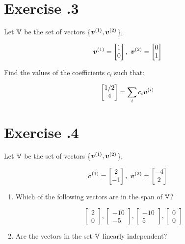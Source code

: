 \documentclass{article}
\begin{document}
\section*{Exercise \chapnumber.3}
Let ${\mathbb{V}}$ be the set of vectors \{${\bm{v}}^{(1)}, {\bm{v}}^{(2)}$\},

\begin{equation}
\vv^{(1)}
=
\begin{bmatrix}
    1\\
    0
\end{bmatrix},\ 
\vv^{(2)}
=
\begin{bmatrix}
    0\\
    1
\end{bmatrix}
\end{equation}

Find the values of the coefficients $c_{i}$ such that:

\begin{equation}
\begin{bmatrix}
    1/2\\
    4
\end{bmatrix} 
=
\sum\limits_{i}c_{i}{\bm{v}}^{(i)}
\end{equation} 

\section*{Exercise \chapnumber.4}
Let ${\mathbb{V}}$ be the set of vectors \{${\bm{v}}^{(1)}, {\bm{v}}^{(2)}$\},

\begin{equation}
\vv^{(1)}
=
\begin{bmatrix}
    2\\
    -1
\end{bmatrix},\ 
\vv^{(2)}
=
\begin{bmatrix}
    -4\\
    2
\end{bmatrix}
\end{equation}

\begin{enumerate}[label=(\alph*)]

\item Which of the following vectors are in the span of ${\mathbb{V}}$?

\begin{equation}
\begin{bmatrix}
    2\\
    0
\end{bmatrix} 
,
\begin{bmatrix}
    -10\\
    -5
\end{bmatrix} 
,
\begin{bmatrix}
    -10\\
    5
\end{bmatrix}
,
\begin{bmatrix}
    0\\
    0
\end{bmatrix}  
\end{equation} 

\item Are the vectors in the set ${\mathbb{V}}$ linearly independent?
\end{enumerate}
\end{document}
